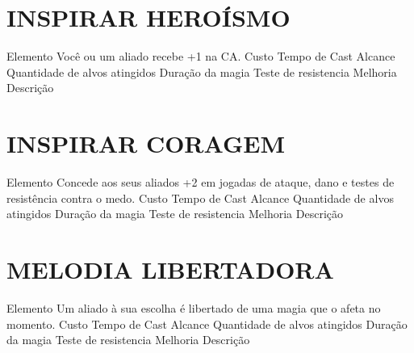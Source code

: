 \documentclass{article}%
\begin{document}
%
\section{INSPIRAR HEROÍSMO}%
\label{sec:INSPIRARHEROSMO}%
Elemento Você ou um aliado recebe +1 na CA.\newline%
Custo \newline%
Tempo de Cast \newline%
Alcance \newline%
Quantidade de alvos atingidos \newline%
Duração da magia \newline%
Teste de resistencia \newline%
Melhoria \newline%
Descrição \newline%

%
\section{INSPIRAR CORAGEM}%
\label{sec:INSPIRARCORAGEM}%
Elemento Concede aos seus aliados +2 em jogadas de ataque, dano e testes de resistência contra o medo.\newline%
Custo \newline%
Tempo de Cast \newline%
Alcance \newline%
Quantidade de alvos atingidos \newline%
Duração da magia \newline%
Teste de resistencia \newline%
Melhoria \newline%
Descrição \newline%

%
\section{MELODIA LIBERTADORA}%
\label{sec:MELODIALIBERTADORA}%
Elemento Um aliado à sua escolha é libertado de uma magia que o afeta no momento.\newline%
Custo \newline%
Tempo de Cast \newline%
Alcance \newline%
Quantidade de alvos atingidos \newline%
Duração da magia \newline%
Teste de resistencia \newline%
Melhoria \newline%
Descrição \newline%
\end{document}
